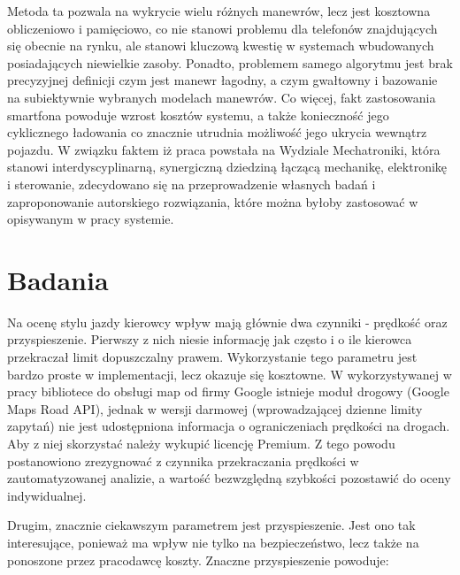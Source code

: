 Metoda ta pozwala na wykrycie wielu różnych manewrów, lecz jest kosztowna obliczeniowo i pamięciowo, co nie stanowi problemu dla telefonów znajdujących się obecnie na rynku, ale stanowi kluczową kwestię w systemach wbudowanych posiadających niewielkie zasoby. Ponadto, problemem samego algorytmu jest brak precyzyjnej definicji czym jest manewr łagodny, a czym gwałtowny i bazowanie na subiektywnie wybranych modelach manewrów. Co więcej, fakt zastosowania smartfona powoduje wzrost kosztów systemu, a także konieczność jego cyklicznego ładowania co znacznie utrudnia możliwość jego ukrycia wewnątrz pojazdu.
W związku faktem iż praca powstała na Wydziale Mechatroniki, która stanowi interdyscyplinarną, synergiczną dziedziną łączącą mechanikę, elektronikę i sterowanie, zdecydowano się na przeprowadzenie własnych badań i zaproponowanie autorskiego rozwiązania, które można byłoby zastosować w opisywanym w pracy systemie.

\clearpage
\section{Badania}
\label{experiments}

Na ocenę stylu jazdy kierowcy wpływ mają głównie dwa czynniki - prędkość oraz przyspieszenie. Pierwszy z nich niesie informację jak często i o ile kierowca przekraczał limit dopuszczalny prawem. Wykorzystanie tego parametru jest bardzo proste w implementacji, lecz okazuje się kosztowne. W wykorzystywanej w pracy bibliotece do obsługi map od firmy Google istnieje moduł drogowy (Google Maps Road API\cite{google_map_road_api}), jednak w wersji darmowej (wprowadzającej dzienne limity zapytań) nie jest udostępniona informacja o ograniczeniach prędkości na drogach. Aby z niej skorzystać należy wykupić licencję Premium. Z tego powodu postanowiono zrezygnować z czynnika przekraczania prędkości w zautomatyzowanej analizie, a wartość bezwzględną szybkości pozostawić do oceny indywidualnej.

Drugim, znacznie ciekawszym parametrem jest przyspieszenie. Jest ono tak interesujące, ponieważ ma wpływ nie tylko na bezpieczeństwo, lecz także na ponoszone przez pracodawcę koszty. Znaczne przyspieszenie powoduje:

